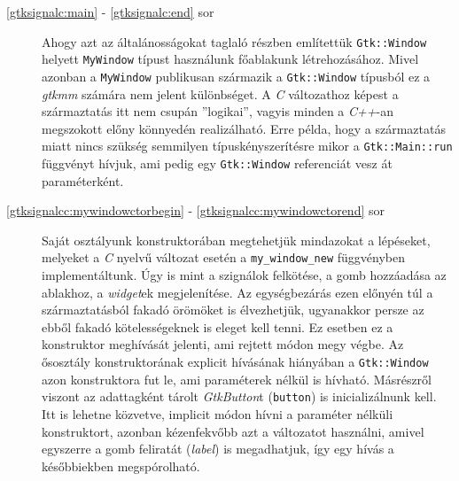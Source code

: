 \begin{description}
 \item[\ref{gtksignalc:main} - \ref{gtksignalc:end} sor] Ahogy azt az általánosságokat taglaló részben említettük \texttt{Gtk::Window} helyett \texttt{MyWindow} típust használunk főablakunk létrehozásához. Mivel azonban a \texttt{MyWindow} publikusan származik a \texttt{Gtk::Window} típusból ez a \textit{gtkmm} számára nem jelent különbséget. A \textit{C} változathoz képest a származtatás itt nem csupán ''logikai'', vagyis minden a \textit{C++}-an megszokott előny könnyedén realizálható. Erre példa, hogy a származtatás miatt nincs szükség semmilyen típuskényszerítésre mikor a \texttt{Gtk::Main::run} függvényt hívjuk, ami pedig egy \texttt{Gtk::Window} referenciát vesz át paraméterként.

 \item[\ref{gtksignalcc:mywindowctorbegin} - \ref{gtksignalcc:mywindowctorend} sor] Saját osztályunk konstruktorában megtehetjük mindazokat a lépéseket, melyeket a \textit{C} nyelvű változat esetén a \texttt{my\_window\_new} függvényben implementáltunk. Úgy is mint a szignálok felkötése, a gomb hozzáadása az ablakhoz, a \textit{widget}ek megjelenítése. Az egységbezárás ezen előnyén túl a származtatásból fakadó örömöket is élvezhetjük, ugyanakkor persze az ebből fakadó kötelességeknek is eleget kell tenni. Ez esetben ez a konstruktor meghívását jelenti, ami rejtett módon megy végbe. Az ősosztály konstruktorának explicit hívásának hiányában a \texttt{Gtk::Window} azon konstruktora fut le, ami paraméterek nélkül is hívható. Másrészről viszont az adattagként tárolt \textit{GtkButton}t (\texttt{button}) is inicializálnunk kell. Itt is lehetne közvetve, implicit módon hívni a paraméter nélküli konstruktort, azonban kézenfekvőbb azt a változatot használni, amivel egyszerre a gomb feliratát (\textit{label}) is megadhatjuk, így egy hívás a későbbiekben megspórolható.


\end{description}
